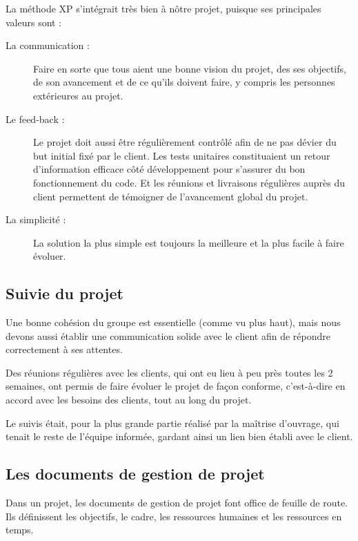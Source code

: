     La méthode XP s'intégrait très bien à nôtre projet, puisque ses principales
    valeurs sont :
    \begin{description}
      \item[La communication :] Faire en sorte que tous aient une bonne vision
      du projet, des ses objectifs, de son avancement et de ce qu'ils doivent
      faire, y compris les personnes extérieures au projet.
      \item[Le feed-back :] Le projet doit aussi être régulièrement contrôlé
      afin de ne pas dévier du but initial fixé par le client. Les tests
      unitaires constituaient un retour d'information efficace côté
      développement pour s'assurer du bon fonctionnement du code. Et les
      réunions et livraisons régulières auprès du client permettent de témoigner
      de l'avancement global du projet.
      \item[La simplicité :] La solution la plus simple est toujours la
      meilleure et la plus facile à faire évoluer.
    \end{description}
  
  
  \subsection{Suivie du projet}
  
    Une bonne cohésion du groupe est essentielle (comme vu plus haut), mais nous
    devons aussi établir une communication solide avec le client afin de répondre
    correctement à ses attentes.
  
    Des réunions régulières avec les clients, qui ont eu lieu à peu près toutes
    les 2 semaines, ont permis de faire évoluer le projet de façon conforme,
    c'est-à-dire en accord avec les besoins des clients, tout au long du projet.
  
    Le suivis était, pour la plus grande partie réalisé par la maîtrise
    d'ouvrage, qui tenait le reste de l'équipe informée, gardant ainsi un lien
    bien établi avec le client.
  
  
  \subsection{Les documents de gestion de projet}
  
    Dans un projet, les documents de gestion de projet font office de feuille de
    route. Ils définissent les objectifs, le cadre, les ressources humaines et
    les ressources en temps.
  
